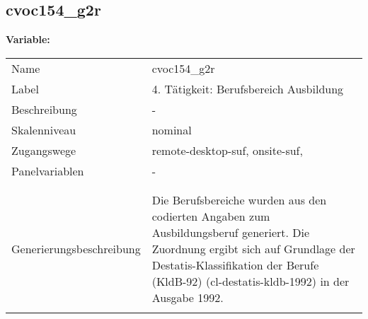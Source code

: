 	
	
	\subsection{cvoc154\_g2r}
	\label{subSection:cvoc154_g2r}

	\noindent\textbf{Variable:}\\
		\begin{tabular}{lL{11.3cm}}
			\label{tableVariable:cvoc154_g2r}
			Name & cvoc154\_g2r \\
			Label & 4. Tätigkeit: Berufsbereich Ausbildung \\
			Beschreibung & - \\
			Skalenniveau & nominal \\
			Zugangswege &
				remote-desktop-suf,
				onsite-suf,
 \\
			Panelvariablen & -
			 \\
			 \\
 \\
					Generierungsbeschreibung & Die Berufsbereiche wurden aus den codierten Angaben zum Ausbildungsberuf generiert. Die Zuordnung ergibt sich auf Grundlage der Destatis-Klassifikation der Berufe (KldB-92) (cl-destatis-kldb-1992) in der Ausgabe 1992. 
				 \\	
			 \\
		\end{tabular}






